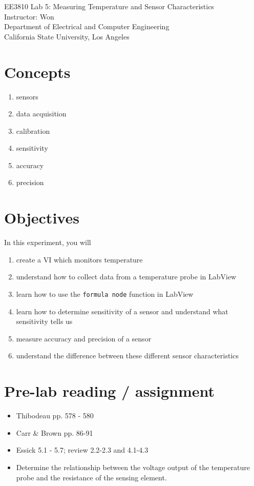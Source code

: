 \documentclass[12pt,oneside]{article}
\begin{document}
\begin{center}
\Large{EE3810 Lab 5: Measuring Temperature and Sensor Characteristics\\}
\large{Instructor: Won\\
Department of Electrical and Computer Engineering\\
California State University, Los Angeles}
\end{center}

\section{Concepts}
\begin{enumerate}
\item sensors
\item data acquisition
\item calibration
\item sensitivity
\item accuracy
\item precision
\end{enumerate}

\section{Objectives} 
In this experiment, you will
\begin{enumerate}
\item create a VI which monitors temperature
\item understand how to collect data from a temperature probe in LabView
\item learn how to use the {\tt formula node} function in LabView
\item learn how to determine sensitivity of a sensor and understand what sensitivity tells us
\item measure accuracy and precision of a sensor
\item understand the difference between these different sensor characteristics
\end{enumerate}

\section{Pre-lab reading / assignment}
\begin{itemize}
\item Thibodeau pp. 578 - 580
\item Carr \& Brown pp. 86-91
\item Essick 5.1 - 5.7; review 2.2-2.3 and 4.1-4.3
\item Determine the relationship between the voltage output of the temperature probe and the resistance of the sensing element.
\end{itemize}
\end{document}
